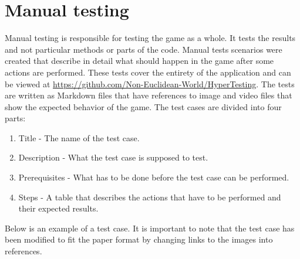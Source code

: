 \section{Manual testing} \label{sec:manual_testing}
Manual testing is responsible for testing the game as a whole.
It tests the results and not particular methods or parts of the code.
Manual tests scenarios were created that describe in detail what should happen in the game after some actions are performed.
These tests cover the entirety of the application and can be viewed at \url{https://github.com/Non-Euclidean-World/HyperTesting}.
The tests are written as Markdown files that have references to image and video files that show the expected behavior of the game.
The test cases are divided into four parts:
\begin{enumerate}
  \item Title - The name of the test case.
  \item Description - What the test case is supposed to test.
  \item Prerequisites - What has to be done before the test case can be performed.
  \item Steps - A table that describes the actions that have to be performed and their expected results.
\end{enumerate}

Below is an example of a test case.
It is important to note that the test case has been modified to fit the paper format by changing links to the images into references.

